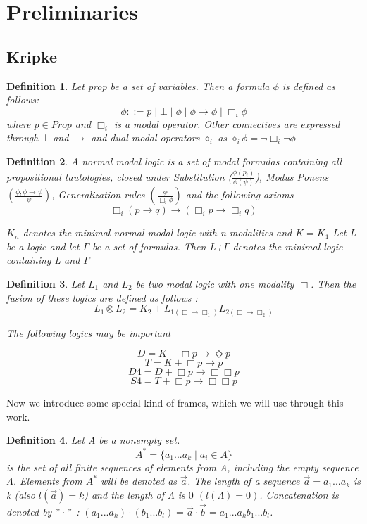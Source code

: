 \documentclass[12pt, a4paper]{scrartcl}
\newtheorem{definition}{Definition}[subsection]
\begin{document}
\section{Preliminaries}

\subsection{Kripke }

\begin{definition}
Let prop be a set of variables. Then a formula $\phi$ is defined as follows:
$$\phi ::= p \mid \bot \mid \phi \mid \phi \rightarrow \phi \mid \Box_i \phi$$
where $p \in Prop$ and $\Box_i$ is a modal operator. Other connectives are expressed through $\bot$ and $\rightarrow$ and 
dual modal operators $\diamond_i$ as $\diamond_i \phi = \neg \Box_i \neg \phi$
\end{definition}

\begin{definition}
A normal modal logic is a set of modal formulas containing all propositional tautologies,
closed under Substitution ($\frac{\phi(p_i)}{\phi(\psi)}$), Modus Ponens 
$(\frac{\phi, \phi \rightarrow \psi}{\psi})$, Generalization rules $(\frac{\phi}{\Box_i \phi})$
and the following axioms 
$$ \Box_i (p \rightarrow q) \rightarrow (\Box_i p \rightarrow \Box_i q)$$

$K_n$ denotes the minimal normal modal logic with n modalities and $K = K_1$
Let L be a logic and let $\Gamma$ be a set of formulas. Then L+$\Gamma$ denotes 
the minimal logic containing L and $\Gamma$
\end{definition}


\begin{definition}
Let $L_1$ and $L_2$ be two modal logic with one modality $\Box$. Then the fusion of these 
logics are defined as follows :
$$ L_1 \otimes L_2 = K_2 + L_{1(\Box \rightarrow \Box_1)} L_{2(\Box \rightarrow \Box_2)} $$

The following logics may be important 

$$D = K + \Box p \rightarrow \Diamond p$$
$$T = K + \Box p \rightarrow p$$
$$D4 = D + \Box p \rightarrow \Box \Box p$$
$$S4 = T + \Box p \rightarrow \Box \Box p$$   
\end{definition}

Now we introduce some special kind of frames, which we will use through this work.
\begin{definition}
    Let A be a nonempty set.
    $$A^* = \{a_1...a_k \mid a_i \in A\}$$ 
    is the set of all finite sequences of elements from A, including the empty sequence $\Lambda$.
    Elements from $A^*$ will be denoted as $\vec{a}$. The length of a sequence $\vec{a} = a_1...a_k$ is k (also $l(\vec{a}) = k$) 
    and the length of $\Lambda$ is $0$ $(l(\Lambda) = 0)$. Concatenation is denoted by $"\cdot"$ : $(a_1...a_k) \cdot (b_1...b_l) = \vec{a} \cdot \vec{b} = a_1...a_kb_1...b_l$.

\end{definition}
\end{document}
